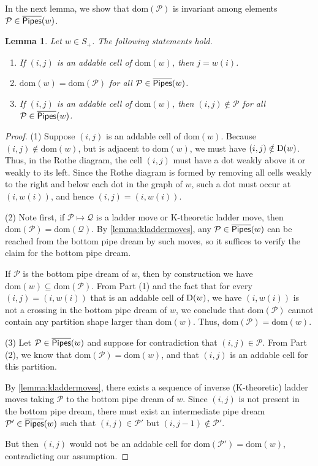 \documentclass[12 pt]{amsart}
\newcommand{\dom}{\mathrm{dom}}
\newtheorem{lemma}[Theorem]{Lemma}
\numberwithin{equation}{section}
\theoremstyle{remark}
\newcommand{\kpipes}{\overline{\sf Pipes}}
\newcommand{\rothe}{{\rm D}}
\begin{document}
		
		In the next lemma, we show that $\dom(\mathcal{P})$ is invariant among elements $\mathcal{P} \in\kpipes(w)$.
		
		\begin{lemma}
			\label{lemma:dominantpartofpipedreams}
			Let $w \in S_{+} $. 
			The following statements hold.
			\begin{enumerate}
				\item If $(i,j)$ is an addable cell of $\dom(w)$, then $j = w(i)$.
				\item $\dom(w) = \dom(\mathcal{P})$ for all $\mathcal{P} \in \kpipes(w)$.
				\item If $(i,j)$ is an addable cell of $\dom(w)$, then $(i,j)\notin \mathcal{P}$ for all $\mathcal{P} \in \kpipes(w)$.
			\end{enumerate}
		\end{lemma}
		\begin{proof}
			
			\noindent (1) Suppose $(i,j)$ is an addable cell of $\dom(w)$. Because $(i,j)\notin \dom(w)$, but is adjacent to $\dom(w)$, we must have $(i,j)\notin \rothe(w)$. 
			Thus, in the Rothe diagram, the cell $(i,j)$ must have a dot weakly above it or weakly to its left. Since the Rothe diagram is formed by removing all cells weakly to the right and below each dot in the graph of $w$, such a dot must occur at $(i, w(i))$, and hence $(i, j) = (i, w(i))$.
			
			\noindent (2) Note first, if $\mathcal{P} \mapsto \mathcal{Q}$ is a ladder move or K-theoretic ladder move, then $\dom(\mathcal{P}) = \dom(\mathcal{Q})$. By \cref{lemma:kladdermoves}, any $\mathcal{P} \in \kpipes(w)$ can be reached from the bottom pipe dream by such moves, so it suffices to verify the claim for the bottom pipe dream.
			
			If $\mathcal{P}$ is the bottom pipe dream of $w$, then by construction we have $\dom(w) \subseteq \dom(\mathcal{P})$. From Part (1) and the fact that for every $(i, j) = (i, w(i))$ that is an addable cell of $\rothe(w)$, we have $(i,w(i))$ is not a crossing in the bottom pipe dream of $w$, we conclude that $\dom(\mathcal{P})$ cannot contain any partition shape larger than $\dom(w)$. Thus, $\dom(\mathcal{P}) = \dom(w)$.
			
			\noindent (3) Let $\mathcal{P} \in \kpipes(w)$ and suppose for contradiction that $(i, j) \in \mathcal{P}$. 
			From Part (2), we know that $\dom(\mathcal{P}) = \dom(w)$, and that $(i, j)$ is an addable cell for this partition.
			
			By \cref{lemma:kladdermoves}, there exists a sequence of inverse (K-theoretic) ladder moves taking $\mathcal{P}$ to the bottom pipe dream of $w$. 
			Since $(i, j)$ is not present in the bottom pipe dream, there must exist an intermediate pipe dream $\mathcal{P}' \in \kpipes(w)$ such that $(i, j) \in \mathcal{P}'$ but $(i, j - 1) \notin \mathcal{P}'$. 
			
			But then $(i, j)$ would not be an addable cell for $\dom(\mathcal{P}') = \dom(w)$, contradicting our assumption.
		\end{proof}
		
\end{document}
